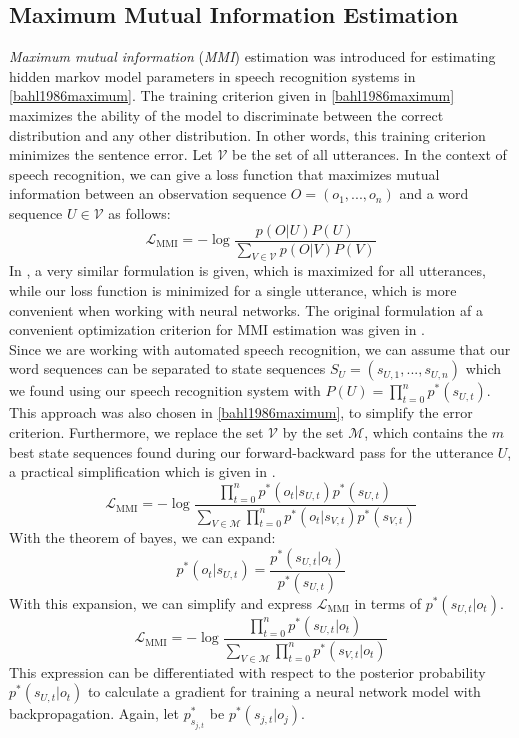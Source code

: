 \subsection{Maximum Mutual Information Estimation}
\label{sec:mmie}
\textit{Maximum mutual information} (\textit{MMI}) estimation was introduced for estimating hidden markov model parameters in speech recognition systems in \ref{bahl1986maximum}. The training criterion given in \ref{bahl1986maximum} maximizes the ability of the model to discriminate between the correct distribution and any other distribution. In other words, this training criterion minimizes the sentence error. Let $\mathcal{V}$ be the set of all utterances. In the context of speech recognition, we can give a loss function that maximizes mutual information between an observation sequence $O = (o_1, ..., o_n)$ and a word sequence $U \in \mathcal{V}$ as follows:
\[
\mathcal{L}_{\text{MMI}} = -\log\frac{p(O|U)P(U)}{\sum_{V \in \mathcal{V}} p(O|V)P(V)} 
\]
In \cite{ghoshal2013sequence}, a very similar formulation is given, which is maximized for all utterances, while our loss function is minimized for a single utterance, which is more convenient when working with neural networks. The original formulation af a convenient optimization criterion for MMI estimation was given in \cite{schluter1998comparison}.\\
Since we are working with automated speech recognition, we can assume that our word sequences can be separated to state sequences $S_U = (s_{U,1},...,s_{U,n})$ which we found using our speech recognition system with $P(U) = \prod_{t = 0}^{n} p^*(s_{U,t})$. This approach was also chosen in \ref{bahl1986maximum}, to simplify the error criterion. Furthermore, we replace the set $\mathcal{V}$ by the set $\mathcal{M}$, which contains the $m$ best state sequences found during our forward-backward pass for the utterance $U$, a practical simplification which is given in \cite{schluter1998comparison}.
\[
\mathcal{L}_{\text{MMI}} = -\log\frac{\prod_{t = 0}^{n} p^*(o_{t}|s_{U,t})p^*(s_{U,t})}{\sum_{V \in \mathcal{M}} \prod_{t = 0}^{n} p^*(o_{t}|s_{V,t})p^*(s_{V,t})} 
\]
With the theorem of bayes, we can expand:
\[
p^*(o_{t}|s_{U,t}) = \frac{p^*(s_{U,t}|o_{t})}{p^*(s_{U,t})}
\]
With this expansion, we can simplify and express $\mathcal{L}_{\text{MMI}}$ in terms of $p^*(s_{U,t}|o_{t})$.
\[
\mathcal{L}_{\text{MMI}} = -\log\frac{\prod_{t = 0}^{n} p^*(s_{U,t}|o_{t})}{\sum_{V \in \mathcal{M}} \prod_{t = 0}^{n} p^*(s_{V,t}|o_{t})} 
\]
This expression can be differentiated with respect to the posterior probability $p^*(s_{U,t}|o_{t})$ to calculate a gradient for training a neural network model with backpropagation. Again, let $p^*_{s_{j,t}}$ be $p^*(s_{j,t}|o_j)$.
